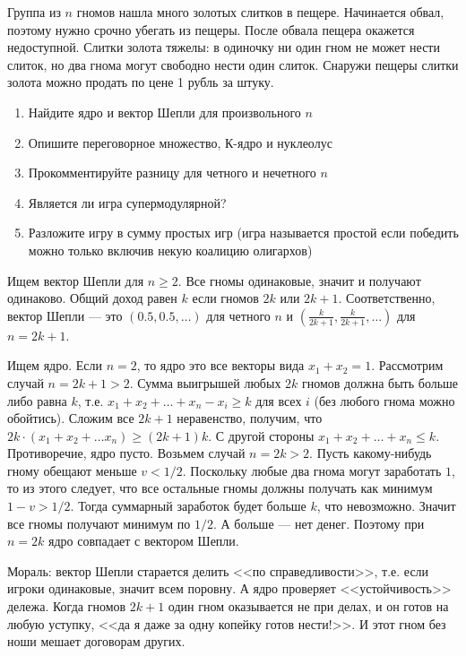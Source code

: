 \begin{problem}
 Группа из $n$ гномов нашла много золотых слитков в пещере. Начинается обвал, поэтому нужно срочно убегать из пещеры. После обвала пещера окажется недоступной. Слитки золота тяжелы: в одиночку ни один гном не может нести слиток, но два гнома могут свободно нести один слиток. Снаружи пещеры слитки золота можно продать по цене 1 рубль за штуку.
\begin{enumerate}
\item Найдите ядро и вектор Шепли для произвольного $n$
\item Опишите переговорное множество, К-ядро и нуклеолус
\item Прокомментируйте разницу для четного и нечетного $n$
\item Является ли игра супермодулярной?
\item Разложите игру в сумму простых игр (игра называется простой если победить можно только включив некую коалицию олигархов) 
\end{enumerate}




\begin{sol}
Ищем вектор Шепли для $n\geq 2$. Все гномы одинаковые, значит и получают одинаково. Общий доход равен $k$ если гномов $2k$ или $2k+1$. Соответственно, вектор Шепли --- это $(0.5,0.5,\ldots )$ для четного $n$ и $(\frac{k}{2k+1},\frac{k}{2k+1},\ldots )$ для $n=2k+1$.

Ищем ядро. Если $n=2$, то ядро это все векторы вида $x_{1}+x_{2}=1$. Рассмотрим случай $n=2k+1>2$. Сумма выигрышей любых $2k$ гномов должна быть больше либо равна $k$, т.е. $x_{1}+x_{2}+\ldots +x_{n}-x_{i}\geq k$ для всех $i$ (без любого гнома можно обойтись). Сложим все $2k+1$ неравенство, получим, что $2k\cdot (x_{1}+x_{2}+\ldots x_{n})\geq (2k+1)k$. С другой стороны $x_{1}+x_{2}+\ldots +x_{n}\leq k$. Противоречие, ядро пусто. Возьмем случай $n=2k>2$. Пусть какому-нибудь гному обещают меньше $v<1/2$. Поскольку любые два гнома могут заработать $1$, то из этого следует, что все остальные гномы должны получать как минимум $1-v>1/2$. Тогда суммарный заработок будет больше $k$, что невозможно. Значит все гномы получают минимум по $1/2$. А больше  --- нет денег. Поэтому при $n=2k$ ядро совпадает с вектором Шепли.

Мораль: вектор Шепли старается делить <<по справедливости>>, т.е. если игроки одинаковые, значит всем поровну. А ядро проверяет <<устойчивость>> дележа. Когда гномов $2k+1$ один гном оказывается не при делах, и он готов на любую уступку, <<да я даже за одну копейку готов нести!>>. И этот гном без ноши мешает договорам других.
\end{sol}
\end{problem}


